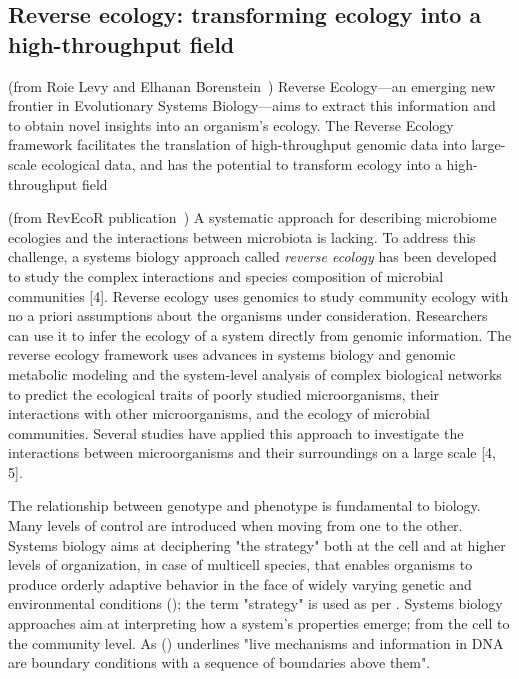       
      
    

   \subsection{Reverse ecology: transforming ecology into a high-throughput field}



      (from Roie Levy and Elhanan Borenstein~\cite{levy2012reverse})
      Reverse Ecology—an emerging new frontier in Evolutionary Systems Biology—aims
      to extract this information and to obtain novel insights into an organism’s ecology.
      The Reverse Ecology framework facilitates the translation of high-throughput
      genomic data into large-scale ecological data, and has the potential to transform
      ecology into a high-throughput field




      (from RevEcoR publication~\cite{cao2016revecor})
      A systematic approach for describing microbiome ecologies and the interactions between microbiota is lacking. 
      To address this challenge, a systems biology approach called \textit{reverse ecology} has been developed 
      to study the complex interactions and species composition of microbial communities [4]. 
      Reverse ecology uses genomics to study community ecology with no a priori assumptions about the organisms under consideration. 
      Researchers can use it to infer the ecology of a system directly from genomic information. 
      The reverse ecology framework uses advances in systems biology and genomic metabolic modeling and 
      the system-level analysis of complex biological networks to predict the ecological traits of poorly studied microorganisms, 
      their interactions with other microorganisms, and the ecology of microbial communities. 
      Several studies have applied this approach to investigate the interactions between microorganisms 
      and their surroundings on a large scale [4, 5].

      The relationship between genotype and phenotype is fundamental to biology.
      Many levels of control are introduced when moving from one to the other. 
      Systems biology aims at deciphering "the strategy" both at the cell and at higher levels of organization, in case of multicell species, that enables organisms to produce orderly adaptive behavior in the face of widely varying genetic and environmental conditions (\cite{strohman2002maneuvering}); 
      the term "strategy" is used as per \cite{polanyi1968life}.
      Systems biology approaches aim at interpreting how a system's properties emerge; 
      from the cell to the community level.
      As \citeauthor{polanyi1968life} (\citeyear{polanyi1968life}) underlines 
      "live mechanisms and information in DNA are boundary conditions with a sequence of boundaries above them". 
      

